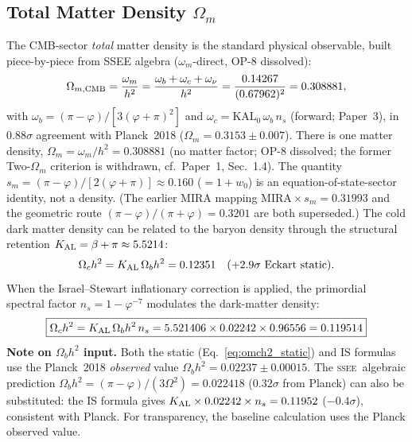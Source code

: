 \documentclass[12pt,a4paper]{article}
\newcommand{\SSEE}{\ifmmode\mathrm{SSEE}\else\textsc{ssee}\fi}
\begin{document}
\subsection{Total Matter Density \texorpdfstring{$\Omega_m$}{Omega\_m}}
\label{sec:matter}

The CMB-sector \emph{total} matter density is the standard physical
observable, built piece-by-piece from SSEE algebra ($\omega_m$-direct,
OP-8 dissolved):
\begin{equation}
\Omega_{m,\rm CMB} = \frac{\omega_m}{h^2}
  = \frac{\omega_b+\omega_c+\omega_\nu}{h^2}
  = \frac{0.14267}{(0.67962)^2} = 0.308881,
\end{equation}
with $\omega_b=(\pi-\varphi)/[3(\varphi+\pi)^2]$ and
$\omega_c=\mathrm{KAL_0}\,\omega_b\,n_s$ (forward; Paper~3), in $0.88\sigma$
agreement with Planck~2018 ($\Omega_m = 0.3153\pm0.007$). There is one matter
density, $\Omega_m=\omega_m/h^2=0.308881$ (no matter factor; OP-8 dissolved;
the former Two-$\Omega_m$ criterion is withdrawn, cf.\ Paper~1, Sec.~1.4).
The quantity $s_m=(\pi-\varphi)/[2(\varphi+\pi)]\approx 0.160$ ($=1+w_0$) is an
equation-of-state-sector identity, not a density. (The earlier MIRA mapping
$\mathrm{MIRA}\times s_m=0.31993$ and the geometric route
$(\pi-\varphi)/(\pi+\varphi)=0.3201$ are both superseded.)
The cold dark matter density can be related to the baryon density through the
structural retention $K_{\rm AL} = \beta + \pi \approx 5.5214$:
\begin{equation}
\Omega_c h^2 = K_{\rm AL}\,\Omega_b h^2 = 0.12351 \quad (+2.9\sigma\text{ Eckart static}).
\label{eq:omch2_static}
\end{equation}
When the Israel--Stewart inflationary correction is applied, the primordial spectral
factor $n_s = 1-\varphi^{-7}$ modulates the dark-matter density:
\begin{equation}
\boxed{\Omega_c h^2 = K_{\rm AL}\,\Omega_b h^2\,n_s
      = 5.521406\times 0.02242\times 0.96556 = 0.119514}
\label{eq:omch2_IS}
\end{equation}
\textbf{Note on $\Omega_b h^2$ input.}
Both the static (Eq.~\ref{eq:omch2_static}) and IS formulas use the Planck~2018
\emph{observed} value $\Omega_b h^2 = 0.02237\pm0.00015$.
The \SSEE\ algebraic prediction $\Omega_b h^2 = (\pi-\varphi)/(3\Omega^2) = 0.022418$
($0.32\sigma$ from Planck) can also be substituted: the IS formula gives
$K_{\rm AL}\times0.02242\times n_s = 0.11952$ ($-0.4\sigma$), consistent with Planck.
For transparency, the baseline calculation uses the Planck observed value.
\end{document}
